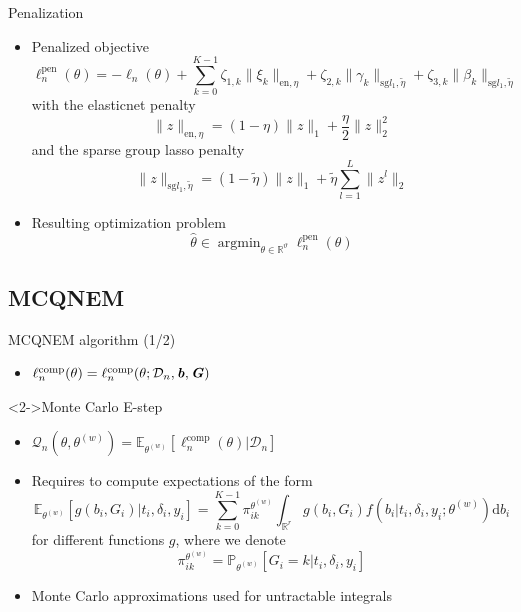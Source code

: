 \documentclass{beamer}
\DeclareMathOperator{\argmin}{argmin}
\newcommand{\dd}{\mathrm{d}}
\newcommand{\E}{\mathbb E}
\newcommand{\R}{\mathbb R}
\renewcommand{\P}{\mathds{P}}
\newcommand{\norm}[1]{\|#1\|}
\newcommand{\cD}{\mathcal D}
\newcommand{\cQ}{\mathcal Q}
\renewcommand{\P}{\mathds P}
\begin{document}
\begin{frame}{Penalization}

\small

\begin{itemize}
  \item<1-> Penalized objective
  \begin{equation*}
  \ell_n^\text{pen}(\theta) = - \ell_n(\theta) + \sum_{k=0}^{K-1} \zeta_{1,k} \norm{\xi_k}_{\text{en}, \eta} + \zeta_{2,k} \norm{\gamma_k}_{\text{sg} l_1, \tilde{\eta}} + \zeta_{3,k} \norm{\beta_k}_{\text{sg} l_1, \tilde{\eta}}
  \end{equation*}
  with the elasticnet penalty \[ \norm{z}_{\text{en}, \eta} = (1-\eta)\norm{z}_1 + \dfrac\eta2 \norm{z}_2^2 \] and the sparse group lasso penalty \[ \norm{z}_{\text{sg} l_1, \tilde{\eta}} = (1-\tilde{\eta})\norm{z}_1 + \tilde{\eta} \sum_{l=1}^L\norm{z^l}_2 \]
  \item<2-> Resulting optimization problem \[\hat \theta \in \argmin_{\theta \in \R^\vartheta} \ell_n^\text{pen}(\theta)\]
\end{itemize}

\end{frame}

\subsection{MCQNEM}

\begin{frame}{MCQNEM algorithm (1/2)}

\small

\begin{itemize}
  \item<1-> $\ell_n^\text{comp}(\theta) = \ell_n^\text{comp}(\theta ; \cD_n, \textbf{\textit{b}}, \textbf{\textit{G}})$
\end{itemize}

\begin{block}<2->{Monte Carlo E-step}
\begin{itemize}
  \item<2-> $\cQ_n(\theta, \theta^{(w)}) = \E_{\theta^{(w)}}[\ell_n^\text{comp}(\theta) | \cD_n]$
  \item<3-> Requires to compute expectations of the form
  \footnotesize
\[ \E_{\theta^{(w)}}[ g(b_i, G_i) | t_i, \delta_i, y_i] = \sum_{k=0}^{K-1} \pi_{ik}^{\theta^{(w)}} \int_{\R^r} g(b_i, G_i) f(b_i | t_i, \delta_i, y_i ; \theta^{(w)}) \dd b_i \] 
\small for different functions $g$, where we denote 
\[\pi_{ik}^{\theta^{(w)}} = \P_{\theta^{(w)}}[G_i = k | t_i, \delta_i, y_i] \]
  \item<4-> Monte Carlo approximations used for untractable integrals
\end{itemize}
\end{block}


\end{frame}
\end{document}
